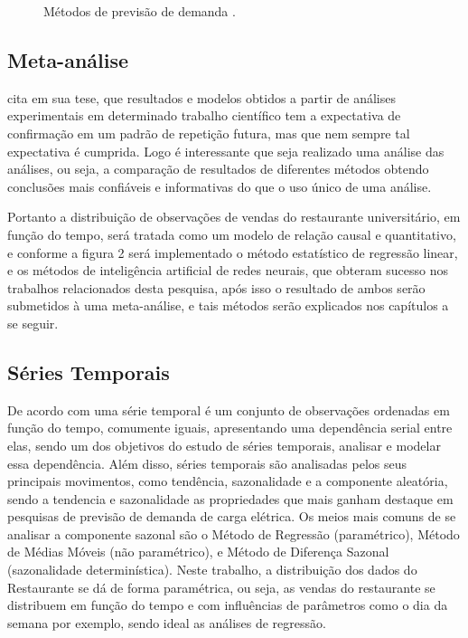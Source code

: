 \documentclass[	12pt, Times, openright, twoside, a4paper, english, brazil]{abntex2}
\begin{document}
          \begin{figure}[!ht]
          	\caption{Métodos de previsão de demanda \cite{Junior2007}.\label{fig:metodosPrevisaoDemanda}}
          \end{figure}

        \subsection{Meta-análise}
          \cite{Flavia2014} cita em sua tese, que resultados e modelos obtidos a partir de análises experimentais em determinado trabalho científico tem a expectativa de confirmação em um padrão de repetição futura, mas que nem sempre tal expectativa é cumprida. Logo é interessante que seja realizado uma análise das análises, ou seja, a comparação de resultados de diferentes métodos obtendo conclusões mais confiáveis e informativas do que o uso único de uma análise.

          Portanto a distribuição de observações de vendas do restaurante universitário, em função do tempo, será tratada como um modelo de relação causal e quantitativo, e conforme a figura 2 será implementado o método estatístico de regressão linear, e os métodos de inteligência artificial de redes neurais, que obteram sucesso nos trabalhos relacionados desta pesquisa, após isso o resultado de ambos serão submetidos à uma meta-análise, e tais métodos serão explicados nos capítulos a se seguir.

        \subsection{Séries Temporais}
          De acordo com  \cite{Morettin1987} uma série temporal é um conjunto de observações ordenadas em função do tempo, comumente iguais, apresentando uma dependência serial entre elas, sendo um dos objetivos do estudo de séries temporais, analisar e modelar essa dependência. Além disso, séries temporais são analisadas pelos seus principais movimentos, como tendência, sazonalidade e a componente aleatória, sendo a tendencia e sazonalidade as propriedades que mais ganham destaque em pesquisas de previsão de demanda de carga elétrica. Os meios mais comuns de se analisar a componente sazonal são o Método de Regressão (paramétrico), Método de Médias Móveis (não paramétrico), e Método de Diferença Sazonal (sazonalidade determinística).  Neste trabalho, a distribuição dos dados do Restaurante se dá de forma paramétrica, ou seja, as vendas do restaurante se distribuem em função do tempo e com influências de parâmetros como o dia da semana por exemplo, sendo ideal as análises de regressão. 
\end{document}
